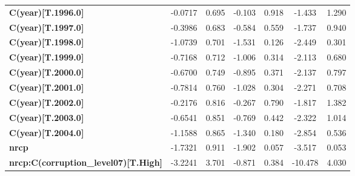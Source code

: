 \begin{center}
\begin{tabular}{lcccccc}
\textbf{C(year)[T.1996.0]}                                                                          &      -0.0717  &        0.695     &    -0.103  &         0.918        &       -1.433    &        1.290     \\
\textbf{C(year)[T.1997.0]}                                                                          &      -0.3986  &        0.683     &    -0.584  &         0.559        &       -1.737    &        0.940     \\
\textbf{C(year)[T.1998.0]}                                                                          &      -1.0739  &        0.701     &    -1.531  &         0.126        &       -2.449    &        0.301     \\
\textbf{C(year)[T.1999.0]}                                                                          &      -0.7168  &        0.712     &    -1.006  &         0.314        &       -2.113    &        0.680     \\
\textbf{C(year)[T.2000.0]}                                                                          &      -0.6700  &        0.749     &    -0.895  &         0.371        &       -2.137    &        0.797     \\
\textbf{C(year)[T.2001.0]}                                                                          &      -0.7814  &        0.760     &    -1.028  &         0.304        &       -2.271    &        0.708     \\
\textbf{C(year)[T.2002.0]}                                                                          &      -0.2176  &        0.816     &    -0.267  &         0.790        &       -1.817    &        1.382     \\
\textbf{C(year)[T.2003.0]}                                                                          &      -0.6541  &        0.851     &    -0.769  &         0.442        &       -2.322    &        1.014     \\
\textbf{C(year)[T.2004.0]}                                                                          &      -1.1588  &        0.865     &    -1.340  &         0.180        &       -2.854    &        0.536     \\
\textbf{nrcp}                                                                                       &      -1.7321  &        0.911     &    -1.902  &         0.057        &       -3.517    &        0.053     \\
\textbf{nrcp:C(corruption\_level07)[T.High]}                                                        &      -3.2241  &        3.701     &    -0.871  &         0.384        &      -10.478    &        4.030     \\

\end{tabular}
\end{center}
